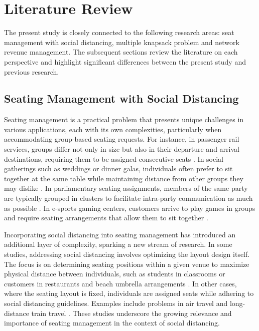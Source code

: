 \section{Literature Review}\label{literature}
The present study is closely connected to the following research areas: seat management with social distancing, multiple knapsack problem and network revenue management. The subsequent sections review the literature on each perspective and highlight significant differences between the present study and previous research.


\subsection{Seating Management with Social Distancing}
Seating management is a practical problem that presents unique challenges in various applications, each with its own complexities, particularly when accommodating group-based seating requests. For instance, in passenger rail services, groups differ not only in size but also in their departure and arrival destinations, requiring them to be assigned consecutive seats \cite{clausen2010off, deplano2019offline}. In social gatherings such as weddings or dinner galas, individuals often prefer to sit together at the same table while maintaining distance from other groups they may dislike \cite{lewis2016creating}. In parliamentary seating assignments, members of the same party are typically grouped in clusters to facilitate intra-party communication as much as possible \cite{vangerven2022parliament}. In e-sports gaming centers, customers arrive to play games in groups and require seating arrangements that allow them to sit together \cite{kwag2022optimal}.

Incorporating social distancing into seating management has introduced an additional layer of complexity, sparking a new stream of research. In some studies, addressing social distancing involves optimizing the layout design itself. The focus is on determining seating positions within a given venue to maximize physical distance between individuals, such as students in classrooms \cite{bortolete2022support} or customers in restaurants and beach umbrella arrangements \cite{fischetti2023safe}. In other cases, where the seating layout is fixed, individuals are assigned seats while adhering to social distancing guidelines. Examples include problems in air travel \cite{ghorbani2020model} and long-distance train travel \cite{haque2022optimization}. These studies underscore the growing relevance and importance of seating management in the context of social distancing.


